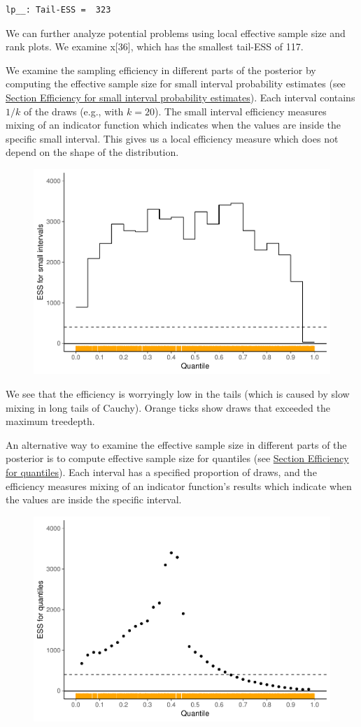 \documentclass[american,]{article}
\begin{document}
\begin{verbatim}
lp__: Tail-ESS =  323
\end{verbatim}

We can further analyze potential problems using local effective sample
size and rank plots. We examine x{[}36{]}, which has the smallest
tail-ESS of 117.

We examine the sampling efficiency in different parts of the posterior
by computing the effective sample size for small interval probability
estimates (see \protect\hyperlink{small_interval_S_eff}{Section
Efficiency for small interval probability estimates}). Each interval
contains \(1/k\) of the draws (e.g., with \(k=20\)). The small interval
efficiency measures mixing of an indicator function which indicates when
the values are inside the specific small interval. This gives us a local
efficiency measure which does not depend on the shape of the
distribution.

\begin{figure}[tp]
  \centering
  \includegraphics[width=0.6\linewidth]{graphics/local-ess-fit-nom-2-1.pdf}
\end{figure}

We see that the efficiency is worryingly low in the tails (which is
caused by slow mixing in long tails of Cauchy). Orange ticks show draws
that exceeded the maximum treedepth.

An alternative way to examine the effective sample size in different
parts of the posterior is to compute effective sample size for quantiles
(see \protect\hyperlink{quantile_S_eff}{Section Efficiency for
quantiles}). Each interval has a specified proportion of draws, and the
efficiency measures mixing of an indicator function's results which
indicate when the values are inside the specific interval.

\begin{figure}[tp]
  \centering
  \includegraphics[width=0.6\linewidth]{graphics/quantile-ess-fit-nom-2-1.pdf}
\end{figure}
\end{document}
